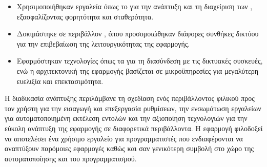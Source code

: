 \begin{itemize}
    \item Χρησιμοποιήθηκαν εργαλεία όπως το  για την ανάπτυξη και τη διαχείριση των , εξασφαλίζοντας φορητότητα και σταθερότητα.
    \item Δοκιμάστηκε σε περιβάλλον , όπου προσομοιώθηκαν διάφορες συνθήκες δικτύου για την επιβεβαίωση της λειτουργικότητας της εφαρμογής.
    \item Εφαρμόστηκαν τεχνολογίες όπως τα  για τη διασύνδεση με τις δικτυακές συσκευές, ενώ η αρχιτεκτονική της εφαρμογής βασίζεται σε μικροϋπηρεσίες για μεγαλύτερη ευελιξία και επεκτασιμότητα.
\end{itemize}

Η διαδικασία ανάπτυξης περιλάμβανε τη σχεδίαση ενός περιβάλλοντος φιλικού προς τον χρήστη για την εισαγωγή και επεξεργασία ρυθμίσεων, την ενσωμάτωση εργαλείων για αυτοματοποιημένη εκτέλεση εντολών και την αξιοποίηση τεχνολογιών  για την εύκολη ανάπτυξη της εφαρμογής σε διαφορετικά περιβάλλοντα.
Η εφαρμογή φιλοδοξεί να αποτελέσει ένα χρήσιμο εργαλείο για προγραμματιστές που ενδιαφέρονται να αναπτύξουν παρόμοιες εφαρμογές καθώς και σαν γενικότερη συμβολή στο χώρο της αυτοματοποίησης και του προγραμματισμού.